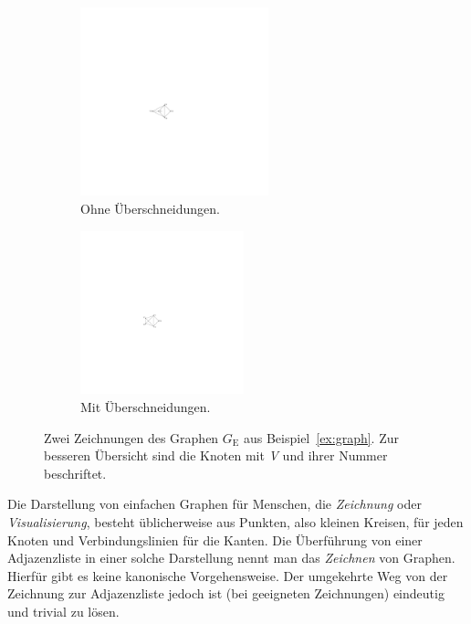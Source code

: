 \documentclass[a4paper]{scrreprt}
\theoremstyle{definition}
\begin{document}
\begin{figure}[h]
        \centering
        \begin{subfigure}[b]{0.4\textwidth}
                \centering
                \includegraphics[width=0.6\textwidth]{exampleA/straightline}
                \caption{Ohne Überschneidungen.}
                \label{fig:exampleAstraightline}
        \end{subfigure}
        \quad
        \begin{subfigure}[b]{0.4\textwidth}
                \centering
                \includegraphics[width=0.52\textwidth]{exampleA/straightlineNonplanar}
                \caption{Mit Überschneidungen.}
                \label{fig:exampleAstraightlineNonplanar}
        \end{subfigure}
        \caption{Zwei Zeichnungen des Graphen $G_\text{E}$ aus Beispiel~\ref{ex:graph}. Zur besseren Übersicht sind die Knoten mit \emph{V} und ihrer Nummer beschriftet.}
\end{figure}


Die Darstellung von einfachen Graphen für Menschen, die \emph{Zeichnung} oder \emph{Visualisierung}, besteht üblicherweise aus Punkten, also kleinen Kreisen, für jeden Knoten und Verbindungslinien für die Kanten. Die Überführung von einer Adjazenzliste in einer solche Darstellung nennt man das \emph{Zeichnen} von Graphen. Hierfür gibt es keine kanonische Vorgehensweise. Der umgekehrte Weg von der Zeichnung zur Adjazenzliste jedoch ist (bei geeigneten Zeichnungen) eindeutig und trivial zu lösen.
\end{document}
